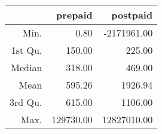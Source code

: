 \begin{table}[ht]
\centering
\begin{tabular}{rrr}
  \hline
 & prepaid & postpaid \\ 
  \hline
Min. & 0.80 & -2171961.00 \\ 
  1st Qu. & 150.00 & 225.00 \\ 
  Median & 318.00 & 469.00 \\ 
  Mean & 595.26 & 1926.94 \\ 
  3rd Qu. & 615.00 & 1106.00 \\ 
  Max. & 129730.00 & 12827010.00 \\ 
   \hline
\end{tabular}
\end{table}
